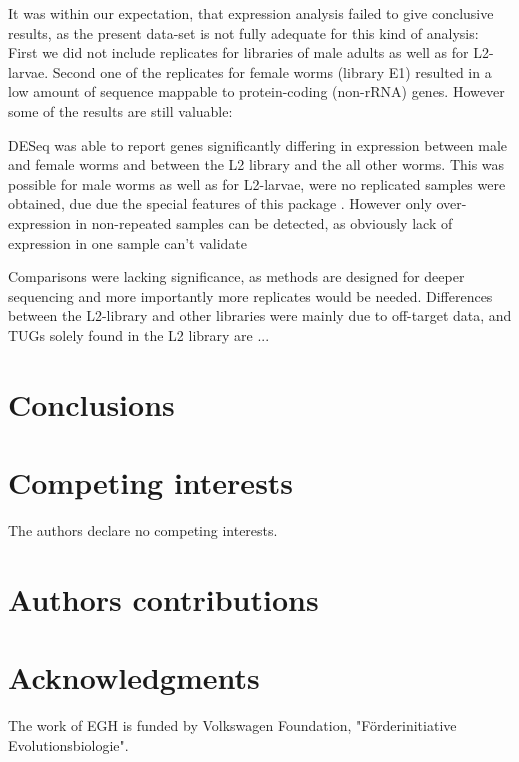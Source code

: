 \documentclass[10pt]{bmc_article}
\newenvironment{bmcformat}{\begin{raggedright}\baselineskip20pt\sloppy\setboolean{publ}{false}}{\end{raggedright}\baselineskip20pt\sloppy}
\begin{document}
\begin{bmcformat}
It was within our expectation, that expression analysis failed to give
conclusive results, as the present data-set is not fully adequate for
this kind of analysis: First we did not include replicates for
libraries of male adults as well as for L2-larvae. Second one of the
replicates for female worms (library E1) resulted in a low amount of
sequence mappable to protein-coding (non-rRNA) genes.
However some of the results are still valuable:

DESeq was able to report genes significantly differing in expression
between male and female worms and between the L2 library and the all
other worms. This was possible for male worms as well as for
L2-larvae, were no replicated samples were obtained, due due the
special features of this package \cite{pmid20979621}. However only
over-expression in non-repeated samples can be detected, as obviously
lack of expression in one sample can't validate

Comparisons were lacking significance, as methods are designed for
deeper sequencing and more importantly more replicates would be
needed. Differences between the L2-library and other libraries were
mainly due to off-target data, and TUGs solely found in the L2 library
are ... 



\section*{Conclusions}

  
\section*{Competing interests}
The authors declare no competing interests.

\section*{Authors contributions}

\section*{Acknowledgments}

The work of EGH is funded by
Volkswagen Foundation, "F\"{o}rderinitiative Evolutionsbiologie".
 

\end{bmcformat}
\end{document}
